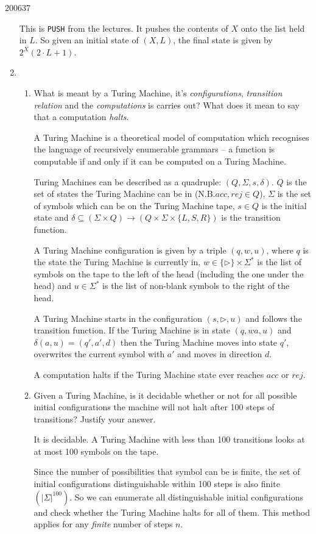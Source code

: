 \documentclass[10pt,\jkfside,a4paper]{article}
\begin{document}
\begin{examquestion}{2006}{3}{7}
\begin{enumerate}
This is \texttt{PUSH} from the lectures. It pushes the contents of $X$ onto
the list held in $L$. So given an initial state of $(X, L)$, the final state
is given by $2^{X}(2 \cdot L + 1)$.

\item

\begin{enumerate}

\item What is meant by a Turing Machine, it's \textit{configurations},
\textit{transition relation} and the \textit{computations} is carries out?
What does it mean to say that a computation \textit{halts}.

A Turing Machine is a theoretical model of computation which recognises the
language of recursively enumerable grammars -- a function is computable if
and only if it can be computed on a Turing Machine.

Turing Machines can be described as a quadruple: $(Q, \Sigma, s, \delta)$.
$Q$ is the set of states the Turing Machine can be in (N.B.\@ $acc, rej \in
Q$), $\Sigma$ is the set of symbols which can be on the Turing Machine tape,
$s \in Q$ is the initial state and $\delta \subseteq (\Sigma \times Q) \to
(Q \times \Sigma \times \{L, S, R\})$ is the transition function.

A Turing Machine configuration is given by a triple $(q, w, u)$, where $q$
is the state the Turing Machine is currently in, $w \in \{\triangleright\}
\times \Sigma^*$ is the list of symbols on the tape to the left of the head
(including the one under the head) and $u \in \Sigma^*$ is the list of
non-blank symbols to the right of the head.

A Turing Machine starts in the configuration $(s, \triangleright, u )$ and
follows the transition function. If the Turing Machine is in state
$(q, wa, u)$ and $\delta(a, u) = (q', a', d)$ then the Turing Machine
moves into state $q'$, overwrites the current symbol with $a'$ and moves in
direction $d$.

A computation halts if the Turing Machine state ever reaches $acc$ or $rej$.

\item Given a Turing Machine, is it decidable whether or not for all
possible initial configurations the machine will not halt after 100 steps of
transitions? Justify your answer.

It is decidable. A Turing Machine with less than 100 transitions looks at at
most 100 symbols on the tape.

Since the number of possibilities that symbol can be is finite, the set of
initial configurations distinguishable within 100 steps is also finite
$\left(|\Sigma|^{100}\right)$. So we can enumerate all distinguishable
initial configurations and check whether the Turing Machine halts for all of
them. This method applies for any \textit{finite} number of steps $n$.

\end{enumerate}

\end{enumerate}

\end{examquestion}
\end{document}
